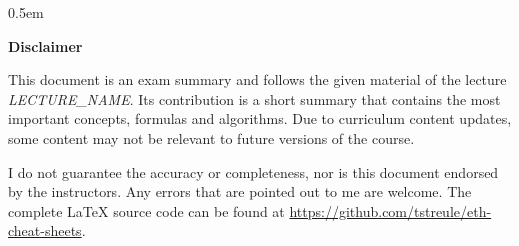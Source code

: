 
\thispagestyle{empty} %
\providecommand\thetitle{LECTURE\_NAME} %

\begin{justify}
\begin{minipage}{.3\textwidth}

    \setmainfont{Noto Serif}
    \color{black}
    \setlength{\parskip}  {0.5em}
    \setlength{\parindent}{1em}

    {\noindent\Large\bfseries Disclaimer}

    This document is an exam summary and follows the given material of the lecture {\itshape \thetitle}.
    Its contribution is a short summary that contains the most important concepts, formulas and algorithms.
    Due to curriculum content updates, some content may not be relevant to future versions of the course.

    I do not guarantee the accuracy or completeness, nor is this document endorsed by the instructors.
    Any errors that are pointed out to me are welcome.
    The complete {\LaTeX} source code can be found at \url{https://github.com/tstreule/eth-cheat-sheets}.

\end{minipage}
\end{justify}

\pagebreak
{}
